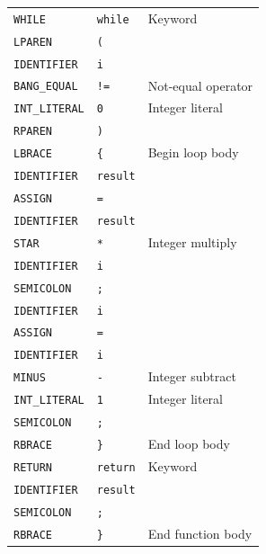 \documentclass[11pt,a4paper]{article}
\begin{document}
\begin{longtable}{@{}lll@{}}
  \rowcolor{rowgray}
  \texttt{WHILE}      & \texttt{while}     & Keyword \\
  \texttt{LPAREN}     & \texttt{(}         & \\
  \rowcolor{rowgray}
  \texttt{IDENTIFIER} & \texttt{i}         & \\
  \texttt{BANG\_EQUAL}& \texttt{!=}        & Not-equal operator \\
  \rowcolor{rowgray}
  \texttt{INT\_LITERAL} & \texttt{0}         & Integer literal \\
  \texttt{RPAREN}     & \texttt{)}         & \\
  \rowcolor{rowgray}
  \texttt{LBRACE}     & \texttt{\{}        & Begin loop body \\
  \texttt{IDENTIFIER} & \texttt{result}    & \\
  \rowcolor{rowgray}
  \texttt{ASSIGN}     & \texttt{=}         & \\
  \texttt{IDENTIFIER} & \texttt{result}    & \\
  \rowcolor{rowgray}
  \texttt{STAR}       & \texttt{*}         & Integer multiply \\
  \texttt{IDENTIFIER} & \texttt{i}         & \\
  \rowcolor{rowgray}
  \texttt{SEMICOLON}  & \texttt{;}         & \\
  \texttt{IDENTIFIER} & \texttt{i}         & \\
  \rowcolor{rowgray}
  \texttt{ASSIGN}     & \texttt{=}         & \\
  \texttt{IDENTIFIER} & \texttt{i}         & \\
  \rowcolor{rowgray}
  \texttt{MINUS}      & \texttt{-}         & Integer subtract \\
  \texttt{INT\_LITERAL} & \texttt{1}         & Integer literal \\
  \rowcolor{rowgray}
  \texttt{SEMICOLON}  & \texttt{;}         & \\
  \texttt{RBRACE}     & \texttt{\}}        & End loop body \\
  \rowcolor{rowgray}
  \texttt{RETURN}     & \texttt{return}    & Keyword \\
  \texttt{IDENTIFIER} & \texttt{result}    & \\
  \rowcolor{rowgray}
  \texttt{SEMICOLON}  & \texttt{;}         & \\
  \texttt{RBRACE}     & \texttt{\}}        & End function body \\

\end{longtable}
\end{document}
